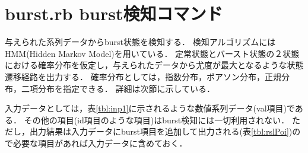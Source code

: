 



\section{burst.rb burst検知コマンド\label{sect:burst}}
与えられた系列データからburst状態を検知する．
検知アルゴリズムにはHMM(Hidden Markov Model)を用いている．
定常状態とバースト状態の２状態における確率分布を仮定し，与えられたデータから尤度が最大となるような状態遷移経路を出力する．
確率分布としては，指数分布，ポアソン分布，正規分布，二項分布を指定できる．
詳細は次節に示している．

入力データとしては，表\ref{tbl:inp1}に示されるような数値系列データ(val項目)である．
その他の項目(id項目のような項目)はburst検知には一切利用されない．
ただし，出力結果は入力データにburst項目を追加して出力される(表\ref{tbl:rslPoi})ので必要な項目があれば入力データに含めておく．

